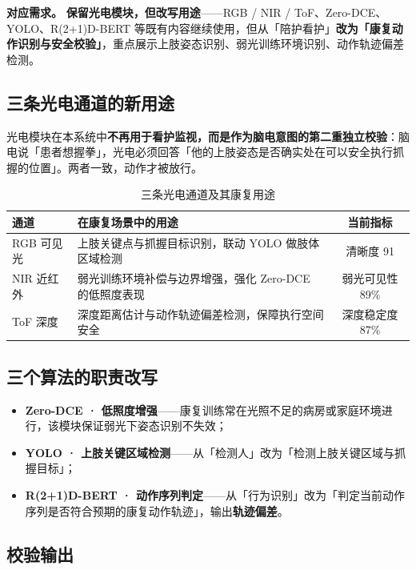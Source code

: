 \documentclass[11pt, a4paper]{ctexart}
\newcommand{\req}[1]{\textcolor{brand}{\sffamily\bfseries #1}}
\begin{document}
\begin{keybox}
\textbf{对应需求。} \req{保留光电模块，但改写用途}——RGB / NIR / ToF、Zero-DCE、YOLO、R(2+1)D-BERT 等既有内容继续使用，但从「陪护看护」\textbf{改为「康复动作识别与安全校验」}，重点展示上肢姿态识别、弱光训练环境识别、动作轨迹偏差检测。
\end{keybox}

\subsection{三条光电通道的新用途}

光电模块在本系统中\textbf{不再用于看护监视，而是作为脑电意图的第二重独立校验}：脑电说「患者想握拳」，光电必须回答「他的上肢姿态是否确实处在可以安全执行抓握的位置」。两者一致，动作才被放行。

\begin{table}[htbp]
\centering
\caption{三条光电通道及其康复用途}
\begin{tabularx}{\textwidth}{@{}l X c@{}}
\toprule
\sffamily\bfseries 通道 & \sffamily\bfseries 在康复场景中的用途 & \sffamily\bfseries 当前指标 \\
\midrule
RGB 可见光 & 上肢关键点与抓握目标识别，联动 YOLO 做肢体区域检测 & 清晰度 91 \\
NIR 近红外 & 弱光训练环境补偿与边界增强，强化 Zero-DCE 的低照度表现 & 弱光可见性 89\% \\
ToF 深度   & 深度距离估计与动作轨迹偏差检测，保障执行空间安全 & 深度稳定度 87\% \\
\bottomrule
\end{tabularx}
\end{table}

\subsection{三个算法的职责改写}

\begin{itemize}[itemsep=3pt, topsep=4pt]
  \item \textbf{Zero-DCE · 低照度增强}——康复训练常在光照不足的病房或家庭环境进行，该模块保证弱光下姿态识别不失效；
  \item \textbf{YOLO · 上肢关键区域检测}——从「检测人」改为「检测上肢关键区域与抓握目标」；
  \item \textbf{R(2+1)D-BERT · 动作序列判定}——从「行为识别」改为「判定当前动作序列是否符合预期的康复动作轨迹」，输出\textbf{轨迹偏差}。
\end{itemize}

\subsection{校验输出}
\end{document}
